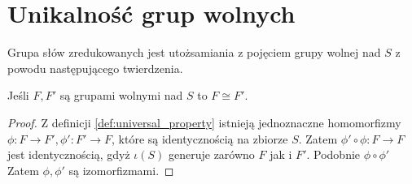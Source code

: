 \section{Unikalność grup wolnych}
Grupa słów zredukowanych jest utożsamiania z pojęciem grupy wolnej nad $S$ z
powodu następującego twierdzenia.

\begin{theorem}
  Jeśli $F, F'$ są grupami wolnymi nad $S$ to $F \cong F'$.
\end{theorem}
\begin{proof}
  Z definicji \ref{def:universal_property} istnieją jednoznaczne homomorfizmy
  $\phi: F \rightarrow F', \phi': F' \rightarrow F$, które są identycznością na
  zbiorze $S$. Zatem $\phi' \circ \phi: F \rightarrow F$ jest identycznością,
  gdyż $\iota(S)$ generuje zarówno $F$ jak i $F'$. Podobnie $\phi \circ \phi'$
  Zatem $\phi, \phi'$ są izomorfizmami.
\end{proof}
